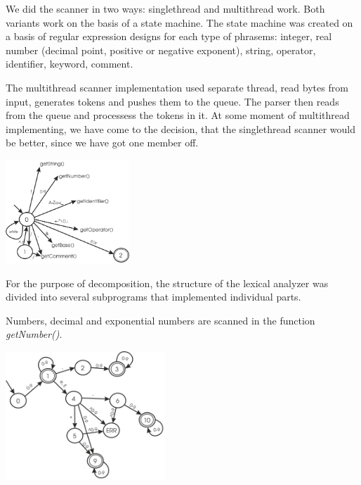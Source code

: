 \documentclass[10pt,a4paper,titlepage]{article}
\begin{document}
\begin{justify}
We did the scanner in two ways: singlethread and multithread work. Both variants work on the basis of a state machine.
The state machine was created on a basis of regular expression designs for each type of phrasems:
integer, real number (decimal point, positive or negative exponent), string, operator, identifier, keyword, comment.

The multithread scanner implementation used separate thread, read bytes from input, generates tokens and pushes
them to the queue. The parser then reads from the queue and processess the tokens in it. At some moment of multithread
implementing, we have come to the decision, that the singlethread scanner would be better, since we have got one member off.

\begin{center}
  \includegraphics[width=0.35\textwidth]{img/general.png}
\end{center}

For the purpose of decomposition, the structure of the lexical analyzer was divided into several subprograms
that implemented individual parts.
\end{justify}

\begin{justify}
Numbers, decimal and exponential numbers are scanned in the function \textit{getNumber()}.
\end{justify}
\begin{center}
  \includegraphics[width=0.45\textwidth]{img/getNumber.png}
\end{center}
\end{document}
